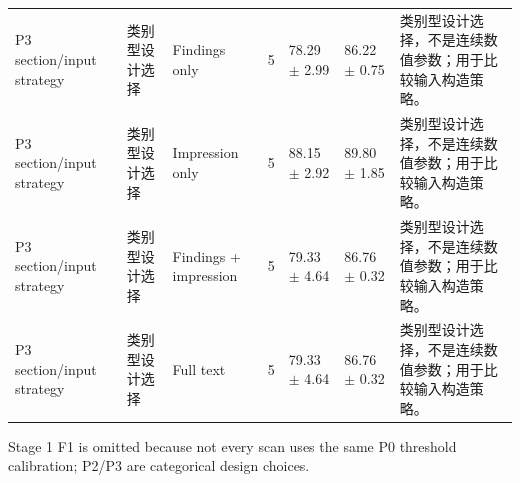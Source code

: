 \begin{table}[t]
{\begin{tabular}{lllllll}
P3 section/input strategy & 类别型设计选择 & Findings only & 5 & 78.29 $\pm$ 2.99 & 86.22 $\pm$ 0.75 & 类别型设计选择，不是连续数值参数；用于比较输入构造策略。 \\
P3 section/input strategy & 类别型设计选择 & Impression only & 5 & 88.15 $\pm$ 2.92 & 89.80 $\pm$ 1.85 & 类别型设计选择，不是连续数值参数；用于比较输入构造策略。 \\
P3 section/input strategy & 类别型设计选择 & Findings + impression & 5 & 79.33 $\pm$ 4.64 & 86.76 $\pm$ 0.32 & 类别型设计选择，不是连续数值参数；用于比较输入构造策略。 \\
P3 section/input strategy & 类别型设计选择 & Full text & 5 & 79.33 $\pm$ 4.64 & 86.76 $\pm$ 0.32 & 类别型设计选择，不是连续数值参数；用于比较输入构造策略。 \\
\bottomrule
\end{tabular}%
}
\vspace{0.3em}
\footnotesize{Stage 1 F1 is omitted because not every scan uses the same P0 threshold calibration; P2/P3 are categorical design choices.}
\end{table}
